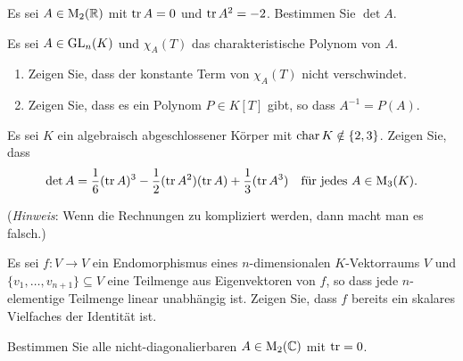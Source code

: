 \documentclass[a4paper,10pt]{scrartcl}
\begin{document}
\begin{question}
  Es sei $A \in \operatorname{M}_2(\mathbb{R})$ mit $\operatorname{tr} A = 0$ und $\operatorname{tr} A^2 = -2$.
  Bestimmen Sie $\det A$.
\end{question}


\begin{question}
  Es sei $A \in \operatorname{GL}_n(K)$ und $\chi_A(T)$ das charakteristische Polynom von $A$.
  \begin{enumerate}[leftmargin=*]
    \item
      Zeigen Sie, dass der konstante Term von $\chi_A(T)$ nicht verschwindet.
    \item
      Zeigen Sie, dass es ein Polynom $P \in K[T]$ gibt, so dass $A^{-1} = P(A)$.
  \end{enumerate}
\end{question}


\begin{question}
  Es sei $K$ ein algebraisch abgeschlossener Körper mit $\operatorname{char} K \notin \{2,3\}$.
  Zeigen Sie, dass
  \[
    \det A = \frac{1}{6} (\operatorname{tr} A)^3 - \frac{1}{2} (\operatorname{tr} A^2)(\operatorname{tr} A) + \frac{1}{3} (\operatorname{tr} A^3)
    \quad
    \text{für jedes $A \in \operatorname{M}_3(K)$}.
  \]
  
  (\emph{Hinweis}:
   Wenn die Rechnungen zu kompliziert werden, dann macht man es falsch.)
\end{question}


\begin{question}
  Es sei $f \colon V \to V$ ein Endomorphismus eines $n$-dimensionalen $K$-Vektorraums $V$ und $\{ v_1, \dotsc, v_{n+1} \} \subseteq V$ eine Teilmenge aus Eigenvektoren von $f$, so dass jede $n$-elementige Teilmenge linear unabhängig ist.
  Zeigen Sie, dass $f$ bereits ein skalares Vielfaches der Identität ist.
\end{question}













\begin{question}
  Bestimmen Sie alle nicht-diagonalierbaren $A \in \operatorname{M}_2(\mathbb{C})$ mit $\operatorname{tr} = 0$.
\end{question}
\end{document}
